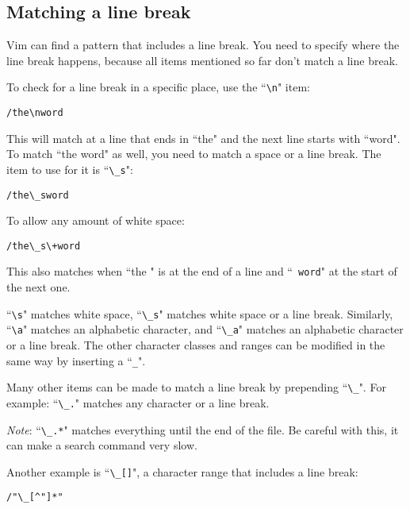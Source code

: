 \subsection{Matching a line break}
Vim can find a pattern that includes a line break.
You need to specify where the line break happens, because all items mentioned so far don't match a line break.

To check for a line break in a specific place, use the ``\texttt{\textbackslash{}n}" item:

\begin{Verbatim}[samepage=true]
 /the\nword
\end{Verbatim}

This will match at a line that ends in ``the" and the next line starts with ``word".
To match ``the word" as well, you need to match a space or a line break.
The item to use for it is ``\texttt{\textbackslash{}\_s}":

\begin{Verbatim}[samepage=true]
 /the\_sword
\end{Verbatim}

To allow any amount of white space:

\begin{Verbatim}[samepage=true]
 /the\_s\+word
\end{Verbatim}

This also matches when ``the  " is at the end of a line and ``\texttt{   word}" at the start of the next one.

``\texttt{\textbackslash{}s}" matches white space, ``\texttt{\textbackslash{}\_s}" matches white space or a line break.
Similarly, ``\texttt{\textbackslash{}a}" matches an alphabetic character, and ``\texttt{\textbackslash{}\_a}" matches an alphabetic character or a line break.
The other character classes and ranges can be modified in the same way by inserting a ``\texttt{\_}".

Many other items can be made to match a line break by prepending ``\texttt{\textbackslash{}\_}".
For example: ``\texttt{\textbackslash{}\_.}" matches any character or a line break.

\emph{Note}: ``\texttt{\textbackslash{}\_.*}" matches everything until the end of the file.
Be careful with this, it can make a search command very slow.

Another example is ``\texttt{\textbackslash{}\_[]}", a character range that includes a line break:

\begin{Verbatim}[samepage=true]
 /"\_[^"]*"
\end{Verbatim}


